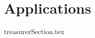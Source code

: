 \documentclass[class=report , crop=false, openany, titlepage, twoside, multi={itemize, figure, verbatim}, float=false]{standalone}
\title{}  %
\begin{document}
\ifstandalone
\maketitle %
\clearpage
\tableofcontents %
\clearpage
\fi
\chapter{Applications}
{treasurerSection.tex}
\clearpage
\end{document}
